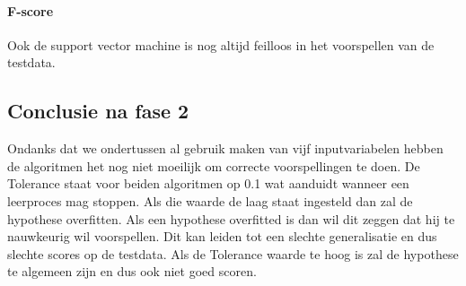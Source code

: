 \paragraph{F-score}

Ook de support vector machine is nog altijd feilloos in het voorspellen van de testdata. 


\subsection{Conclusie na fase 2}
Ondanks dat we ondertussen al gebruik maken van vijf inputvariabelen hebben de algoritmen het nog niet moeilijk om correcte voorspellingen te doen. De Tolerance staat voor beiden algoritmen op 0.1 wat aanduidt wanneer een leerproces mag stoppen. Als die waarde de laag staat ingesteld dan zal de hypothese overfitten. Als een hypothese overfitted is dan wil dit zeggen dat hij te nauwkeurig wil voorspellen. Dit kan leiden tot een slechte generalisatie en dus slechte scores op de testdata. Als de Tolerance waarde te hoog is zal de hypothese te algemeen zijn en dus ook niet goed scoren. 